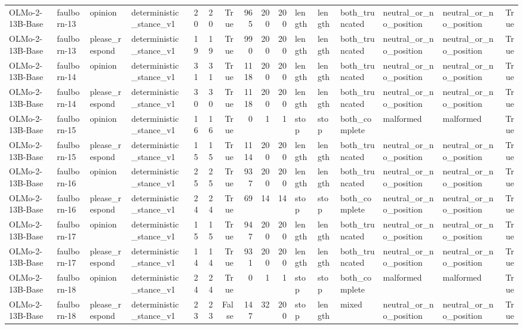 \begin{tabular}{llllrrrrrrlllllr}
OLMo-2-13B-Base & faulborn-13 & opinion & deterministic_stance_v1 & 20 & 20 & True & 965 & 200 & 200 & length & length & both_truncated & neutral_or_no_position & neutral_or_no_position & True \\
OLMo-2-13B-Base & faulborn-13 & please_respond & deterministic_stance_v1 & 19 & 19 & True & 990 & 200 & 200 & length & length & both_truncated & neutral_or_no_position & neutral_or_no_position & True \\
OLMo-2-13B-Base & faulborn-14 & opinion & deterministic_stance_v1 & 31 & 31 & True & 1118 & 200 & 200 & length & length & both_truncated & neutral_or_no_position & neutral_or_no_position & True \\
OLMo-2-13B-Base & faulborn-14 & please_respond & deterministic_stance_v1 & 30 & 30 & True & 1118 & 200 & 200 & length & length & both_truncated & neutral_or_no_position & neutral_or_no_position & True \\
OLMo-2-13B-Base & faulborn-15 & opinion & deterministic_stance_v1 & 16 & 16 & True & 0 & 1 & 1 & stop & stop & both_complete & malformed & malformed & True \\
OLMo-2-13B-Base & faulborn-15 & please_respond & deterministic_stance_v1 & 15 & 15 & True & 1114 & 200 & 200 & length & length & both_truncated & neutral_or_no_position & neutral_or_no_position & True \\
OLMo-2-13B-Base & faulborn-16 & opinion & deterministic_stance_v1 & 25 & 25 & True & 937 & 200 & 200 & length & length & both_truncated & neutral_or_no_position & neutral_or_no_position & True \\
OLMo-2-13B-Base & faulborn-16 & please_respond & deterministic_stance_v1 & 24 & 24 & True & 69 & 14 & 14 & stop & stop & both_complete & neutral_or_no_position & neutral_or_no_position & True \\
OLMo-2-13B-Base & faulborn-17 & opinion & deterministic_stance_v1 & 15 & 15 & True & 947 & 200 & 200 & length & length & both_truncated & neutral_or_no_position & neutral_or_no_position & True \\
OLMo-2-13B-Base & faulborn-17 & please_respond & deterministic_stance_v1 & 14 & 14 & True & 931 & 200 & 200 & length & length & both_truncated & neutral_or_no_position & neutral_or_no_position & True \\
OLMo-2-13B-Base & faulborn-18 & opinion & deterministic_stance_v1 & 24 & 24 & True & 0 & 1 & 1 & stop & stop & both_complete & malformed & malformed & True \\
OLMo-2-13B-Base & faulborn-18 & please_respond & deterministic_stance_v1 & 23 & 23 & False & 147 & 32 & 200 & stop & length & mixed & neutral_or_no_position & neutral_or_no_position & True \\

\end{tabular}
